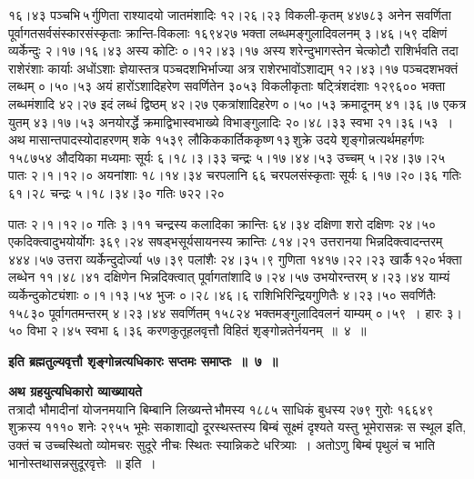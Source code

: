\documentclass[11pt, openany]{book}
\begin{document}
\begin{sloppypar}
\noindent १६।४३ पञ्चभि\textendash \,५\textendash \,र्गुणिता राश्यादयो जातमंशादिः १२।२६।२३ विकली-कृतम् ४४७८३ अनेन सवर्णिता पूर्वागतसर्वसंस्कारसंस्कृताः क्रान्ति-विकलाः १६९४२७ भक्ता लब्धमङ्गुलादिवलनम् ३।४६।५९ दक्षिणं व्यर्केन्दुः २।१७।१६।४३ अस्य कोटिः ०।१२।४३।१७ अस्य शरेन्दुभागस्तेन चेत्कोटौ राशिर्भवति तदा राशेरंशाः कार्याः अधोंऽशाः ज्ञेयास्तत्र पञ्चदशभिर्भाज्या अत्र राशेरभावोंऽशाद्यम् १२।४३।१७ पञ्चदशभक्तं लब्धम् ०।५०।५३ अयं हारोंऽशादिहरेण सवर्णितेन ३०५३ विकलीकृताः षट्त्रिंशदंशाः १२९६०० भक्ता लब्धमंशादि ४२।२७ इदं लब्धं द्विष्ठम् ४२।२७ एकत्रांशादिहरेण ०।५०।५३ क्रमादूनम् ४१।३६।७ एकत्र युतम् ४३।१७।५३ अनयोरर्द्धे क्रमाद्विभास्वभाख्ये विभाङ्गुलादिः २०।४८।३३ स्वभा २१।३६।५३~। अथ मासान्तपादस्योदाहरणम् शके १५३९ लौकिककार्तिककृष्ण\textendash \,१३\textendash \,शुक्रे उदये शृङ्गोन्नत्यर्थमहर्गणः १५८७५४ औदयिका मध्यमाः सूर्यः ६।१८।३।३३ चन्द्रः ५।१७।४४।५३ उच्चम् ५।२४।३७।२५ पातः २।१।१२।० अयनांशाः १८।१४।३४ चरपलानि ६६ चरपलसंस्कृताः सूर्यः ६।१७।२०।३६ गतिः ६१।२८ चन्द्रः ५।१८।३४।३० गतिः ७२२।२०
\end{sloppypar}

\newpage

\begin{sloppypar}
\noindent पातः २।१।१२।० गतिः ३।११ चन्द्रस्य कलादिका क्रान्तिः ६४।३४ दक्षिणा शरो दक्षिणः २४।५० एकदिक्त्वादुभयोर्योगः ३६९।२४ सषड्भसूर्यसायनस्य क्रान्तिः ८१४।२१ उत्तरानया भिन्नदिक्त्वादन्तरम् ४४४।५७ उत्तरा व्यर्केन्दुदोर्ज्या ५७।३९ पलांशैः २४।३५।९ गुणिता १४१७।२२।२३ खार्कै\textendash \,१२०\textendash \,र्भक्ता लब्धेन ११।४८।४१ दक्षिणेन भिन्नदिक्त्वात् पूर्वागतांशादि ७।२४।५७ उभयोरन्तरम् ४।२३।४४ याम्यं व्यर्केन्दुकोट्यंशाः ०।१।१३।५४ भुजः ०।२८।४६।६ राशिभिरिन्द्रियगुणितैः ४।२३।५० सवर्णितैः १५८३० पूर्वागतमन्तरम् ४।२३।४४ सवर्णितम् १५८२४ भक्तमङ्गुलादिवलनं याम्यम् ०।५९~। हारः ३।५० विभा २।४५ स्वभा ६।३६ करणकुतूहलवृत्तौ विहितं शृङ्गोन्नतेर्नयनम्~॥~४~॥
\vspace{2mm}

\begin{center}
{\large \textbf{इति ब्रह्मतुल्यवृत्तौ शृङ्गोन्नत्यधिकारः सप्तमः समाप्तः~॥~७~॥}}
\end{center}
\vspace{2mm}

{\small \textbf{अथ ग्रहयुत्यधिकारो व्याख्यायते\textendash }}\\

तत्रादौ भौमादीनां योजनमयानि बिम्बानि लिख्यन्ते\textendash \,भौमस्य १८८५ साधिकं बुधस्य २७९ गुरोः १६६४९ शुक्रस्य १११० शनेः २९५५ भूमेः सकाशाद्यो दूरस्थस्तस्य बिम्बं सूक्ष्मं दृश्यते यस्तु भूमेरासन्नः स स्थूल इति, उक्तं च {\color{violet}उच्चस्थितो व्योमचरः सुदूरे नीचः स्थितः स्यान्निकटे धरित्र्याः~। अतोऽणु बिम्बं पृथुलं च भाति भानोस्तथासन्नसुदूरवृत्तेः~॥} इति~।
\end{sloppypar}
\end{document}
